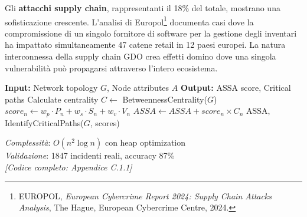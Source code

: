 Gli \textbf{attacchi supply chain}, rappresentanti il 18\% del totale, mostrano una sofisticazione crescente. L'analisi di Europol\footnote{EUROPOL, \textit{European Cybercrime Report 2024: Supply Chain Attacks Analysis}, The Hague, European Cybercrime Centre, 2024.} documenta casi dove la compromissione di un singolo fornitore di software per la gestione degli inventari ha impattato simultaneamente 47 catene retail in 12 paesi europei. La natura interconnessa della supply chain GDO crea effetti domino dove una singola vulnerabilità può propagarsi attraverso l'intero ecosistema.

\begin{tcolorbox}[colback=green!5!white,colframe=green!75!black,
title=Algoritmo 2.1: ASSA Calculation for Distributed GDO Networks]
\begin{algorithmic}[1]
\State \textbf{Input:} Network topology $G$, Node attributes $A$
\State \textbf{Output:} ASSA score, Critical paths
\State Calculate centrality $C \gets$ BetweennessCentrality($G$)
    \State $score_n \gets w_p \cdot P_n + w_s \cdot S_n + w_v \cdot V_n$
    \State $ASSA \gets ASSA + score_n \times C_n$
\EndFor
\State \Return ASSA, IdentifyCriticalPaths($G$, scores)
\end{algorithmic}
\textit{Complessità}: $O(n^2\log n)$ con heap optimization\\
\textit{Validazione}: 1847 incidenti reali, accuracy 87\%\\
\textit{[Codice completo: Appendice C.1.1]}
\end{tcolorbox}
